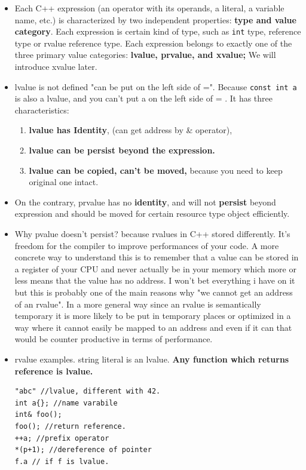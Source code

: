 \documentclass[a4paper,11pt,twoside]{book}
\begin{document}
\begin{itemize}

	\item Each C++ expression (an operator with its operands, a literal, a variable name, etc.) is characterized by two independent properties: \textbf{type and value category}. Each expression is certain kind of type, such as \texttt{int} type, reference type or rvalue reference type. Each expression belongs to exactly one of the three primary value categories: \textbf{lvalue, prvalue, and xvalue;} We will introduce xvalue later. 

	\item lvalue is not defined "can be put on the left side of =". Because \texttt{const int a} is also a lvalue, and you can't put a on the left side of = . It has three characteristics:
\begin{enumerate}
	\item\textbf{lvalue has Identity}, (can get address by \& operator),
	\item \textbf{lvalue can be persist beyond the expression. }
	\item \textbf{lvalue can be copied, can't be moved,} because you need to keep original one intact.
\end{enumerate}

	\item On the contrary, prvalue has no \textbf{identity}, and will not \textbf{persist} beyond expression and should be moved for certain resource type object efficiently.

	\item Why pvalue doesn't persist? because rvalues in C++ stored differently. It's freedom for the compiler to improve performances of your code. A more concrete way to understand this is to remember that a value can be stored in a register of your CPU and never actually be in your memory which more or less means that the value has no address. I won't bet everything i have on it but this is probably one of the main reasons why "we cannot get an address of an rvalue". In a more general way since an rvalue is semantically temporary it is more likely to be put in temporary places or optimized in a way where it cannot easily be mapped to an address and even if it can that would be counter productive in terms of performance.

\item rvalue examples. string literal is an lvalue. \textbf{Any function which returns reference is lvalue.}
\begin{lstlisting}
"abc" //lvalue, different with 42.
int a{}; //name varabile 
int& foo();
foo(); //return reference.
++a; //prefix operator
*(p+1); //dereference of pointer
f.a // if f is lvalue.
\end{lstlisting}



\end{itemize}
\end{document}
